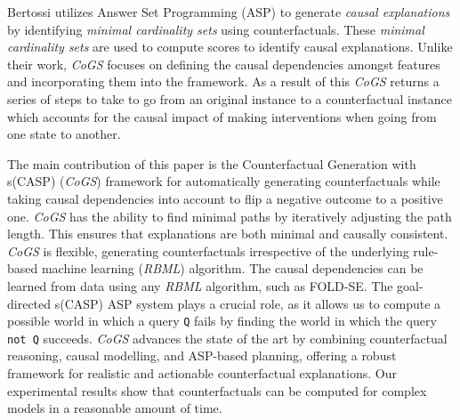 Bertossi \cite{ref_bertossi} utilizes Answer Set Programming (ASP) to generate \textit{causal explanations} by identifying \textit{minimal cardinality sets} using counterfactuals. These \textit{minimal cardinality sets} are used to compute scores to identify causal explanations. Unlike their work, \textit{CoGS} focuses on defining the causal dependencies amongst features and incorporating them into the framework. As a result of this \textit{CoGS} returns a series of steps to take to go from an original instance to a counterfactual instance which accounts for the causal impact of making interventions when going from one state to another.


The main contribution of this paper is the Counterfactual Generation with s(CASP) (\textit{CoGS}) framework for automatically generating counterfactuals while taking causal dependencies into account to flip a negative outcome to a positive one. \textit{CoGS} has the ability to find minimal paths by iteratively adjusting the path length.
This ensures that explanations are both minimal and causally consistent. \textit{CoGS} is flexible, generating counterfactuals irrespective of the underlying rule-based machine learning (\textit{RBML}) algorithm. The causal dependencies can be learned from data using any \textit{RBML} algorithm, such as FOLD-SE. The goal-directed s(CASP) ASP system plays a crucial role, as it allows us to compute a possible world in which a query {\tt Q} fails by finding the world in which the query {\tt not Q} succeeds. \textit{CoGS} advances the state of the art by combining counterfactual reasoning, causal modelling, and ASP-based planning, offering a robust framework for realistic and actionable counterfactual explanations. Our experimental results show that counterfactuals can be computed for complex models in a reasonable amount of time.